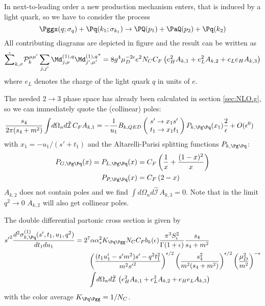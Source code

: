 In next-to-leading order a new production mechanism enters, that is induced by a light quark, so we have to consider the process
\begin{equation}
\Pggx(q;\sigma_q) + \Pq(k_1;\sigma_{k_1}) \rightarrow \PQ(p_1)+\PaQ(p_2) + \Pq(k_2)
\end{equation}
All contributing diagrams are depicted in figure  and the result can be written as
\begin{equation}
\hat\sum_{k,\sigma}\mathcal P_{k}^{\mu\mu'}\sum_{j,j'}{\Md^{(1),q}_{j,\mu}\Md^{(1),q}_{j',\mu'}}^* = 8g^4\mu_D^{-2\epsilon}e^2 N_C C_F\left( e_H^2 A_{k,1} +  e_L^2 A_{k,2} +  e_L e_H A_{k,3} \right)
\end{equation}
where $e_L$ denotes the charge of the light quark $q$ in units of $e$.

The needed $2\rightarrow 3$ phase space has already been calculated in section \ref{sec:NLO.g}, so we can immediately quote the (collinear) poles:
\begin{align}
\frac{s_4}{2\pi(s_4+m^2)}\int\!d\Omega_n d\hat{\mathcal I}\,C_F A_{k,1} &=-\frac 1 {u_1}B_{k,QED}\left(\!\begin{array}{l}s'\rightarrow x_1s'\\t_1\rightarrow x_1 t_1\end{array}\!\!\right) P_{k,\Pg\Pq}(x_1)\frac 2 \epsilon + O(\epsilon^0)
\end{align}
with $x_1 = -u_1/(s'+t_1)$ and the Altarelli-Parisi splitting functions $P_{k,\Pg\Pq}$\cite{Altarelli:1977zs,Vogelsang:1995vh}:
\begin{align}
P_{G,\Pg\Pq}(x) = P_{L,\Pg\Pq}(x) &= C_F\left(\frac 1 x + \frac {(1-x)^2} x\right) \label{eq:PGLgq} \\
P_{P,\Pg\Pq}(x) &= C_F\left(2-x\right) \label{eq:PPgq}
\end{align}
$A_{k,2}$ does not contain poles and we find $\int\!d\Omega_n d\hat{\mathcal I}\,A_{k,3}=0$. Note that in the limit $q^2\rightarrow 0$ $A_{k,2}$ will also get collinear poles.


The double differential partonic cross section is given by
\begin{align}
{s'}^2\frac{d^2\sigma_{k,\Pq}^{(1)}(s',t_1,u_1,q^2)}{dt_1du_1} &= 2^7\alpha\alpha_s^2 K_{\Pq\Pgg}N_CC_Fb_k(\epsilon)\frac{\pi^3 S_\epsilon^2}{\Gamma(1+\epsilon)} \frac{s_4}{s_4+m^2}  \nonumber\\
 &\hspace{20pt} \left(\frac{(t_1u_1'-s'm^2)s' - q^2t_1^2}{m^2{s'}^2}\right)^{\epsilon/2} \left(\frac{s_4^2}{m^2(s_4+m^2)}\right)^{\epsilon/2} \left(\frac{\mu_D^2}{m^2}\right)^{-\epsilon} \nonumber\\
 &\hspace{20pt} \int\!d\Omega_n d\hat{\mathcal I}\,\left(e_H^2 A_{k,1} + e_L^2 A_{k,2} + e_H e_L A_{k,3} \right)
\end{align}
with the color average $K_{\Pq\Pgg} = 1/N_C$.
